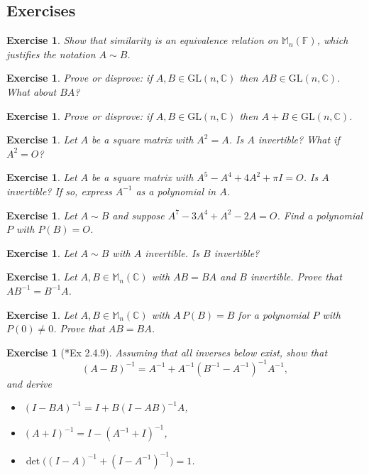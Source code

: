 \documentclass[12pt]{article}
\theoremstyle{breakplain}
\theoremstyle{breakdef}
\newtheorem{ex}[subsubsection]{Exercise}
\theoremstyle{remark}
\begin{document}
\newpage
\subsection{Exercises}
\begin{ex}
    Show that similarity is an equivalence relation on $\mathbb{M}_n(\mathbb{F})$, which justifies the notation $ A \sim B $.
\end{ex}
\begin{ex}
    Prove or disprove: if $A,B \in \mathrm{GL}(n,\mathbb{C})$ then $AB\in\mathrm{GL}(n,\mathbb{C})$. What about $BA$?
\end{ex}
\begin{ex}
    Prove or disprove: if $A,B \in \mathrm{GL}(n,\mathbb{C})$ then $ A+B\in\mathrm{GL}(n,\mathbb{C}) $.
\end{ex}
\begin{ex}
    Let $A$ be a square matrix with $ A^2=A $. Is $A$ invertible? What if $ A^2=O $?
\end{ex}
\begin{ex}
    Let $A$ be a square matrix with $A^{5} - A^{4} + 4A^{2}+ \pi I=O$. Is $A$ invertible? If so, express $A^{-1}$ as a polynomial in $A$.
\end{ex}
\begin{ex}
    Let $A\sim B$ and suppose $ A^7-3A^4+A^2-2A=O $. Find a polynomial $P$ with $ P(B)=O $.
\end{ex}
\begin{ex}
    Let $A\sim B$ with $A$ invertible. Is $ B $ invertible?
\end{ex}
\begin{ex}
    Let $A,B\in \mathbb{M}_n(\mathbb{C})$ with $AB=BA$ and $B$ invertible. Prove that $AB^{-1}=B^{-1}A$.
\end{ex}
\begin{ex}
    Let $A,B\in \mathbb{M}_n(\mathbb{C})$ with $A\,P(B)=B$ for a polynomial $P$ with $P(0)\neq0$. Prove that $AB=BA$.
\end{ex}
\begin{ex}[\cite{Z3}*{Ex 2.4.9}]
    Assuming that all inverses below exist, show that
    \[(A-B)^{-1}=A^{-1}+A^{-1}(B^{-1}-A^{-1})^{-1}A^{-1},\]
    and derive
    \begin{itemize}
        \item $(I-BA)^{-1}=I+B(I-AB)^{-1}A$,
        \item $(A+I)^{-1}=I-(A^{-1}+I)^{-1}$,
        \item $\det\big((I-A)^{-1}+(I-A^{-1})^{-1}\big)=1$.
    \end{itemize}
\end{ex}
\end{document}
